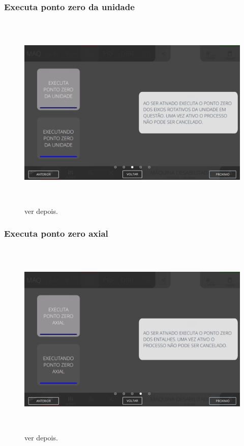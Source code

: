 \newpage
\thispagestyle{fancy}
\vspace*{\fill}
\subsubsection{\small{Executa ponto zero da unidade}}
\begin{figure}[h]
  \centering
  \includegraphics[width=576px,height=360px]{src/images/05-slotter/commands/e-3.png}
  \caption{ver depois.}
   \label{}
\end{figure}
\vspace*{\fill}


\newpage
\thispagestyle{fancy}
\vspace*{\fill}
\subsubsection{\small{Executa ponto zero axial}}
\begin{figure}[h]
  \centering
  \includegraphics[width=576px,height=360px]{src/images/05-slotter/commands/e-4.png}
  \caption{ver depois.}
   \label{}
\end{figure}
\vspace*{\fill}

